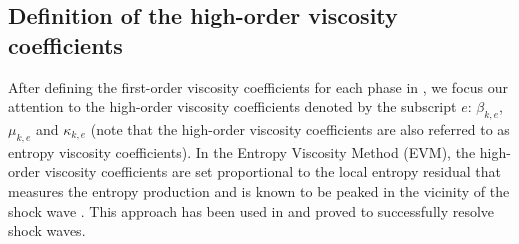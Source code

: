 \documentclass[preprint,10pt]{elsarticle}
\begin{document}
\subsection{Definition of the high-order viscosity coefficients}\label{sec:visc-coeff-ho}
%
After defining the first-order viscosity coefficients for each phase in , we focus our attention to the high-order viscosity coefficients 
denoted by the subscript $e$: $\beta_{k,e}$, $\mu_{k,e}$ and $\kappa_{k,e}$ 
(note that the high-order viscosity coefficients are also referred to as entropy viscosity coefficients). In the Entropy Viscosity Method (EVM), the high-order 
viscosity coefficients are set proportional to the local entropy 
residual that measures the entropy production and is known to be peaked in the vicinity of the shock wave \cite{Leveque}. This approach has been used in 
\cite{jlg1, jlg2, jlg3} and proved to successfully resolve shock waves. 
\end{document}
